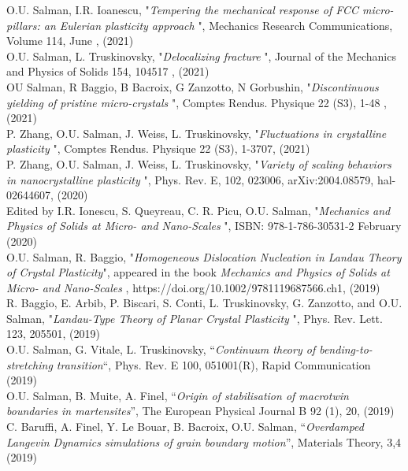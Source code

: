 \documentclass[paper=a4,fontsize=11pt]{temp} %
\begin{document}
O.U. Salman, I.R. Ioanescu, "\textit{Tempering the mechanical response of FCC micro-pillars: an Eulerian plasticity approach
}",  Mechanics Research Communications, Volume 114, June , (2021)\\

O.U. Salman, L. Truskinovsky, "\textit{Delocalizing fracture
}", Journal of the Mechanics and Physics of Solids 154,  104517 , (2021)\\

OU Salman, R Baggio, B Bacroix, G Zanzotto, N Gorbushin, "\textit{Discontinuous yielding of pristine micro-crystals
}", Comptes Rendus. Physique 22 (S3), 1-48 , (2021)\\


P. Zhang, O.U. Salman, J. Weiss, L. Truskinovsky, "\textit{Fluctuations in crystalline plasticity
}", Comptes Rendus. Physique 22 (S3), 1-3707, (2021)\\


P. Zhang, O.U. Salman, J. Weiss, L. Truskinovsky, "\textit{Variety of scaling behaviors in nanocrystalline plasticity
}", Phys. Rev. E, 102, 023006, arXiv:2004.08579, hal-02644607, (2020)\\

Edited by I.R. Ionescu, S. Queyreau, C. R. Picu, O.U. Salman, "\textit{Mechanics and Physics of Solids at Micro- and Nano-Scales
}", ISBN: 978-1-786-30531-2 February (2020)\\

O.U. Salman, R. Baggio, "\textit{Homogeneous Dislocation Nucleation in Landau Theory of Crystal Plasticity}", appeared in the book \textit{Mechanics and Physics of Solids at Micro- and Nano-Scales
}, https://doi.org/10.1002/9781119687566.ch1, (2019)\\


R. Baggio, E. Arbib, P. Biscari, S. Conti, L. Truskinovsky, G. Zanzotto, and O.U. Salman, "\textit{Landau-Type Theory of Planar Crystal Plasticity
}", Phys. Rev. Lett. 123, 205501,  (2019)\\

O.U. Salman, G. Vitale, L. Truskinovsky, “\textit{Continuum theory of bending-to-stretching transition}“, Phys. Rev. E 100, 051001(R), Rapid Communication (2019)\\

O.U. Salman, B. Muite, A. Finel, “\textit{Origin of stabilisation of macrotwin boundaries in martensites}”, The European Physical Journal B 92 (1), 20, (2019) \\

C. Baruffi, A. Finel, Y. Le Bouar, B. Bacroix, O.U. Salman,  “\textit{Overdamped Langevin Dynamics simulations of grain boundary motion}”, Materials Theory, 3,4 (2019)\\
\end{document}
